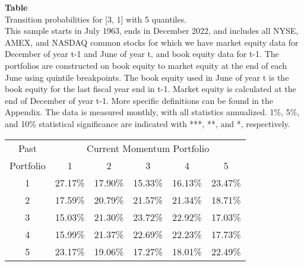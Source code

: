 \begin{table*}[ht!]
\raggedright
{}
\label{tab: transition_probs_[3, 1]_with_5_quantiles}
\textbf{Table \thetable} \\
Transition probabilities for [3, 1] with 5 quantiles. \\
\hspace*{1em}This sample starts in July 1963, ends in December 2022, and includes all NYSE, AMEX, and NASDAQ common stocks for which we have market equity data for December of year t-1 and June of year t, and book equity data for t-1. The portfolios are constructed on book equity to market equity at the end of each June using quintile breakpoints.  The book equity used in June of year t is the book equity for the last fiscal year end in t-1.  Market equity is calculated at the end of December of year t-1.  More specific definitions can be found in the Appendix.  The data is measured monthly, with all statistics annualized.  1\%, 5\%, and 10\% statistical significance are indicated with ***, **, and *, respectively. \\
\vspace{0.5em}
\centering
\begin{adjustbox}{max width=\textwidth}
\begin{tabular}{@{}cccccc@{}}
\toprule
Past & \multicolumn{5}{c}{Current Momentum Portfolio} \\
Portfolio & 1 & 2 & 3 & 4 & 5 \\
\midrule
1 & 27.17\% & 17.90\% & 15.33\% & 16.13\% & 23.47\% \\
2 & 17.59\% & 20.79\% & 21.57\% & 21.34\% & 18.71\% \\
3 & 15.03\% & 21.30\% & 23.72\% & 22.92\% & 17.03\% \\
4 & 15.99\% & 21.37\% & 22.69\% & 22.23\% & 17.73\% \\
5 & 23.17\% & 19.06\% & 17.27\% & 18.01\% & 22.49\% \\
\bottomrule
\end{tabular}
\end{adjustbox}
\end{table*}